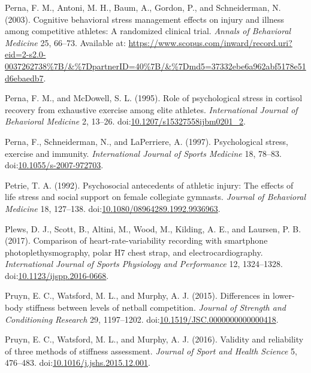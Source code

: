 \documentclass[utf8]{frontiersHLTH}
\begin{document}
\leavevmode\hypertarget{ref-Perna2003}{}%
Perna, F. M., Antoni, M. H., Baum, A., Gordon, P., and Schneiderman, N.
(2003). Cognitive behavioral stress management effects on injury and
illness among competitive athletes: A randomized clinical trial.
\emph{Annals of Behavioral Medicine} 25, 66--73. Available at:
\url{https://www.scopus.com/inward/record.uri?eid=2-s2.0-0037262738\%7B/\&\%7DpartnerID=40\%7B/\&\%7Dmd5=37332ebe6a962abf5178e51d6ebaedb7}.

\leavevmode\hypertarget{ref-Perna1995}{}%
Perna, F. M., and McDowell, S. L. (1995). Role of psychological stress
in cortisol recovery from exhaustive exercise among elite athletes.
\emph{International Journal of Behavioral Medicine} 2, 13--26.
doi:\href{https://doi.org/10.1207/s15327558ijbm0201_2}{10.1207/s15327558ijbm0201\_2}.

\leavevmode\hypertarget{ref-Perna1997}{}%
Perna, F., Schneiderman, N., and LaPerriere, A. (1997). Psychological
stress, exercise and immunity. \emph{International Journal of Sports
Medicine} 18, 78--83.
doi:\href{https://doi.org/10.1055/s-2007-972703}{10.1055/s-2007-972703}.

\leavevmode\hypertarget{ref-Petrie1992}{}%
Petrie, T. A. (1992). Psychosocial antecedents of athletic injury: The
effects of life stress and social support on female collegiate gymnasts.
\emph{Journal of Behavioral Medicine} 18, 127--138.
doi:\href{https://doi.org/10.1080/08964289.1992.9936963}{10.1080/08964289.1992.9936963}.

\leavevmode\hypertarget{ref-Plews2017}{}%
Plews, D. J., Scott, B., Altini, M., Wood, M., Kilding, A. E., and
Laursen, P. B. (2017). Comparison of heart-rate-variability recording
with smartphone photoplethysmography, polar H7 chest strap, and
electrocardiography. \emph{International Journal of Sports Physiology
and Performance} 12, 1324--1328.
doi:\href{https://doi.org/10.1123/ijspp.2016-0668}{10.1123/ijspp.2016-0668}.

\leavevmode\hypertarget{ref-Pruyn2015}{}%
Pruyn, E. C., Watsford, M. L., and Murphy, A. J. (2015). Differences in
lower-body stiffness between levels of netball competition.
\emph{Journal of Strength and Conditioning Research} 29, 1197--1202.
doi:\href{https://doi.org/10.1519/JSC.0000000000000418}{10.1519/JSC.0000000000000418}.

\leavevmode\hypertarget{ref-Pruyn2016}{}%
Pruyn, E. C., Watsford, M. L., and Murphy, A. J. (2016). Validity and
reliability of three methods of stiffness assessment. \emph{Journal of
Sport and Health Science} 5, 476--483.
doi:\href{https://doi.org/10.1016/j.jshs.2015.12.001}{10.1016/j.jshs.2015.12.001}.
\end{document}
